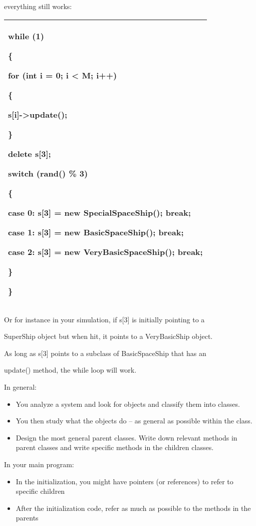 \documentclass[
]{article}
\providecommand{\tightlist}{%
  \setlength{\itemsep}{0pt}\setlength{\parskip}{0pt}}
\begin{document}
everything still works:

\begin{longtable}[]{@{}l@{}}
\toprule
\endhead
\begin{minipage}[t]{0.97\columnwidth}\raggedright
while (1)

\{

for (int i = 0; i \textless{} M; i++)

\{

s{[}i{]}-\textgreater update();

\}

delete s{[}3{]};

switch (rand() \% 3)

\{

case 0: s{[}3{]} = new SpecialSpaceShip(); break;

case 1: s{[}3{]} = new BasicSpaceShip(); break;

case 2: s{[}3{]} = new VeryBasicSpaceShip(); break;

\}

\}\strut
\end{minipage}\tabularnewline
\bottomrule
\end{longtable}

Or for instance in your simulation, if s{[}3{]} is initially pointing to
a

SuperShip object but when hit, it points to a VeryBasicShip object.

As long as s{[}3{]} points to a subclass of BasicSpaceShip that has an

update() method, the while loop will work.

In general:

\begin{itemize}
\tightlist
\item
  You analyze a system and look for objects and classify them into
  classes.
\item
  You then study what the objects do -- as general as possible within
  the class.
\item
  Design the most general parent classes. Write down relevant methods in
  parent classes and write specific methods in the children classes.
\end{itemize}

In your main program:

\begin{itemize}
\tightlist
\item
  In the initialization, you might have pointers (or references) to
  refer to specific children
\item
  After the initialization code, refer as much as possible to the
  methods in the parents
\end{itemize}
\end{document}
